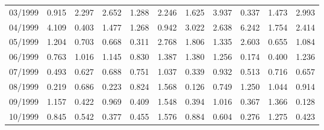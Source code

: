 \begin{tabular}{lrrrrrrrrrr}
03/1999 &  0.915 &  2.297 &  2.652 &  1.288 &  2.246 &  1.625 &  3.937 &  0.337 &  1.473 &  2.993 \\
04/1999 &  4.109 &  0.403 &  1.477 &  1.268 &  0.942 &  3.022 &  2.638 &  6.242 &  1.754 &  2.414 \\
05/1999 &  1.204 &  0.703 &  0.668 &  0.311 &  2.768 &  1.806 &  1.335 &  2.603 &  0.655 &  1.084 \\
06/1999 &  0.763 &  1.016 &  1.145 &  0.830 &  1.387 &  1.380 &  1.256 &  0.174 &  0.400 &  1.236 \\
07/1999 &  0.493 &  0.627 &  0.688 &  0.751 &  1.037 &  0.339 &  0.932 &  0.513 &  0.716 &  0.657 \\
08/1999 &  0.219 &  0.686 &  0.223 &  0.824 &  1.568 &  0.126 &  0.749 &  1.250 &  1.044 &  0.914 \\
09/1999 &  1.157 &  0.422 &  0.969 &  0.409 &  1.548 &  0.394 &  1.016 &  0.367 &  1.366 &  0.128 \\
10/1999 &  0.845 &  0.542 &  0.377 &  0.455 &  1.576 &  0.884 &  0.604 &  0.276 &  1.275 &  0.423 \\
\bottomrule
\end{tabular}
